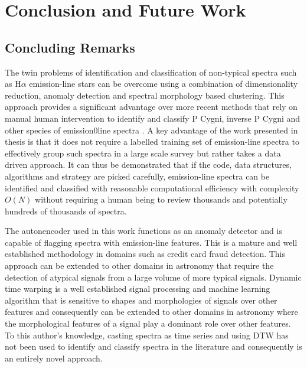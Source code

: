 \chapter{Conclusion and Future Work}

\section{Concluding Remarks}

The twin problems of identification and classification of non-typical spectra such as H$\alpha$ emission-line stars can be overcome using a combination of dimensionality reduction, anomaly detection and spectral morphology based clustering. This approach provides a significant advantage over more recent methods that rely on manual human intervention to identify and classify P Cygni, inverse P Cygni and other species of emission0line spectra \cite{zhang2021catalog} \cite{zhao2012lamost}. A key advantage of the work presented in thesis is that it does not require a labelled training set of emission-line spectra to effectively group such spectra in a large scale survey but rather takes a data driven approach. It can thus be demonstrated that if the code, data structures, algorithms and strategy are picked carefully, emission-line spectra can be identified and classified with reasonable computational efficiency with complexity $O(N)$ without requiring a human being to review thousands and potentially hundreds of thousands of spectra.

The autonencoder used in this work functions as an anomaly detector and is capable of flagging spectra with emission-line features. This is a mature and well established methodology in domains such as credit card fraud detection. This approach can be extended to other domains in astronomy that require the detection of atypical signals from a large volume of more typical signals. Dynamic time warping is a well established signal processing and machine learning algorithm that is sensitive to shapes and morphologies of signals over other features and consequently can be extended to other domains in astronomy where the morphological features of a signal play a dominant role over other features. To this author's knowledge, casting spectra as time series and using DTW has not been used to identify and classify spectra in the literature and consequently is an entirely novel approach. 

